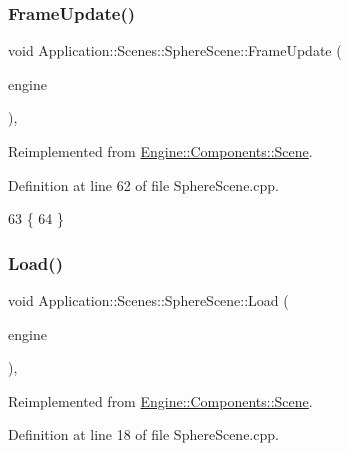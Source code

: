 \subsubsection{\texorpdfstring{Frame\+Update()}{FrameUpdate()}}
{\footnotesize\ttfamily void Application\+::\+Scenes\+::\+Sphere\+Scene\+::\+Frame\+Update (\begin{DoxyParamCaption}\item[{\mbox{\hyperlink{classEngine_1_1BaseEngine}{Engine\+::\+Base\+Engine}} $\ast$}]{engine }\end{DoxyParamCaption})\hspace{0.3cm}{\ttfamily [override]}, {\ttfamily [virtual]}}



Reimplemented from \mbox{\hyperlink{classEngine_1_1Components_1_1Scene_abd8fcdcac52dbce6a0a18de3860ab087}{Engine\+::\+Components\+::\+Scene}}.



Definition at line 62 of file Sphere\+Scene.\+cpp.


\begin{DoxyCode}
63 \{
64 \}
\end{DoxyCode}
\mbox{\label{classApplication_1_1Scenes_1_1SphereScene_adf6f95bf2ac8f0e84935d04248407ba4}} 
\subsubsection{\texorpdfstring{Load()}{Load()}}
{\footnotesize\ttfamily void Application\+::\+Scenes\+::\+Sphere\+Scene\+::\+Load (\begin{DoxyParamCaption}\item[{\mbox{\hyperlink{classEngine_1_1BaseEngine}{Engine\+::\+Base\+Engine}} $\ast$}]{engine }\end{DoxyParamCaption})\hspace{0.3cm}{\ttfamily [override]}, {\ttfamily [virtual]}}



Reimplemented from \mbox{\hyperlink{classEngine_1_1Components_1_1Scene_a23c5b23e66646443670a487e7c016e73}{Engine\+::\+Components\+::\+Scene}}.



Definition at line 18 of file Sphere\+Scene.\+cpp.



